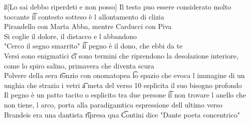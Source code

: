 \documentclass[12pt]{article}
\begin{document}
\ss[Lo sai debbo riperdeti e non posso]
Il testo puo essere considerato molto toccante \t il contesto sotteso è l allontamento di clizia \\
Pirandello con Marta Abba, mentre Carducci con Piva \\
Si coglie il dolore, il distacco e l abbandono \\
"Cerco il segno smarrito" \t il pegno è il dono, che ebbi da te \\
Versi sono enigmatici \t ci sono termini che riprendono la desolazione interiore, come lo spiro salino, primavera che diventa scura \\
Polvere della sera \t ronzio con onomatopea \t lo spazio che evoca l immagine di un unghia che strazia i vetri \t a meta del verso 10 esplicita il suo bisogno profondo \\
Il pegno è un patto tacito o esplicito tra due persone \t il non trovare l anello che non tiene, l arco, porta alla paradigamtica espressione dell ultimo verso \\
Brandeis era una dantista \t ripresa qua \t Contini dice "Dante poeta concentrico"
\end{document}
